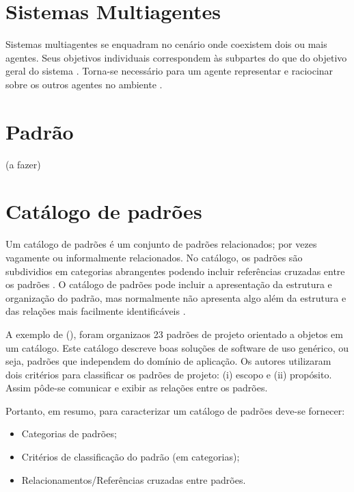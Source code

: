 \section{Sistemas Multiagentes}

Sistemas multiagentes se enquadram no cenário onde coexistem dois ou mais agentes. Seus objetivos individuais  correspondem às subpartes do que do objetivo geral do sistema \cite{mcarthur2007multi}. Torna-se necessário para um agente representar e raciocinar sobre os outros agentes no ambiente \cite[pág. 887]{van2008handbook}. 


\section{Padrão}

(a fazer)

\section{Catálogo de padrões}

Um catálogo de padrões é um conjunto de padrões relacionados; por vezes vagamente ou informalmente relacionados. No catálogo, os padrões são subdividios em categorias abrangentes podendo incluir referências cruzadas entre os padrões \cite{appleton1997}. O catálogo de padrões pode incluir a apresentação da estrutura e organização do padrão, mas normalmente não apresenta algo além da estrutura e das relações mais  facilmente identificáveis \cite{appleton1997}.

A exemplo de \citeauthor{gamma1995} (\citeyear{gamma1995}), foram organizaos 23 padrões de projeto orientado a objetos em um catálogo. Este catálogo descreve boas soluções de software de uso genérico, ou seja, padrões que independem do domínio de aplicação. Os autores utilizaram dois critérios para classificar os padrões de projeto: (i) escopo e (ii) propósito. Assim pôde-se comunicar e exibir as relações entre os padrões.

Portanto, em resumo, para caracterizar um catálogo de padrões deve-se fornecer:

\begin{itemize}
    \item Categorias de padrões;
    \item Critérios de classificação do padrão (em categorias);
    \item Relacionamentos/Referências cruzadas entre padrões.
\end{itemize}

